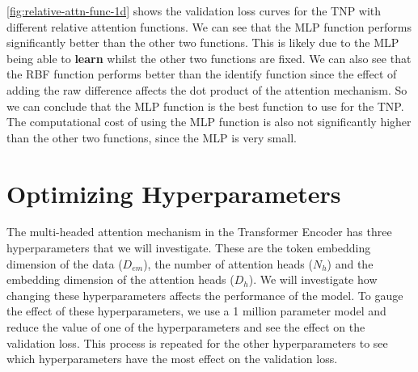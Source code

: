 \documentclass[../../main.tex]{subfiles}
\begin{document}
\autoref{fig:relative-attn-func-1d} shows the validation loss curves for the TNP with different relative attention functions. We can see that the MLP function performs significantly better than the other two functions. This is likely due to the MLP being able to \textbf{learn} whilst the other two functions are fixed. We can also see that the RBF function performs better than the identify function since the effect of adding the raw difference affects the dot product of the attention mechanism. So we can conclude that the MLP function is the best function to use for the TNP. The computational cost of using the MLP function is also not significantly higher than the other two functions, since the MLP is very small.



\section{Optimizing Hyperparameters}

The multi-headed attention mechanism in the Transformer Encoder has three hyperparameters that we will investigate. These are
the token embedding dimension of the data ($D_{em}$), the number of attention heads ($N_h$) and the embedding dimension of the attention heads ($D_h$). We will investigate how changing these hyperparameters affects the performance of the model. To gauge the effect of these hyperparameters, we use a 1 million parameter model and reduce the value of one of the hyperparameters and see the effect on the validation loss. This process is repeated for the other hyperparameters to see which hyperparameters have the most effect on the validation loss. 
\end{document}
